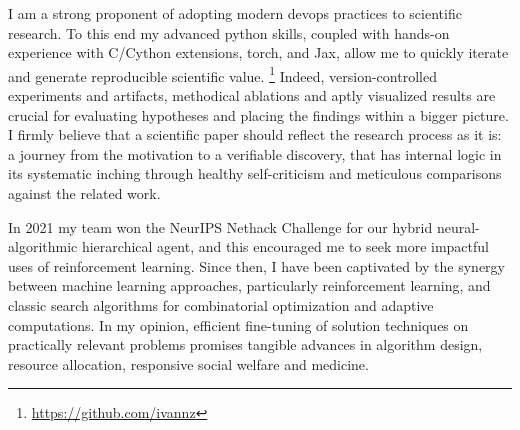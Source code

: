 \documentclass[12pt]{letter}
\begin{document}
I am a strong proponent of adopting modern devops practices to scientific research. To this end my advanced python skills, coupled with hands-on experience with C/Cython extensions, torch, and Jax, allow me to quickly iterate and generate reproducible scientific value.%
\footnote{
    \url{https://github.com/ivannz}
}
Indeed, version-controlled experiments and artifacts, methodical ablations and aptly visualized results are crucial for evaluating hypotheses and placing the findings within a bigger picture. I firmly believe that a scientific paper should reflect the research process as it is: a journey from the motivation to a verifiable discovery, that has internal logic in its systematic inching through healthy self-criticism and meticulous comparisons against the related work.
\par\medskip
% 

In 2021 my team won the NeurIPS Nethack Challenge for our hybrid neural-algorithmic hierarchical agent, and this encouraged me to seek more impactful uses of reinforcement learning. Since then, I have been captivated by the synergy between machine learning approaches, particularly reinforcement learning, and classic search algorithms for combinatorial optimization and adaptive computations. In my opinion, efficient fine-tuning of solution techniques on practically relevant problems promises tangible advances in algorithm design, resource allocation, responsive social welfare and medicine.
\par\medskip


\end{document}
